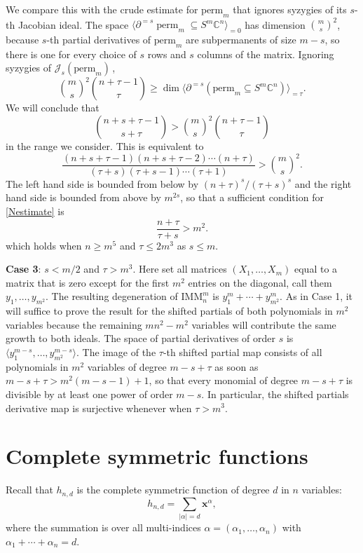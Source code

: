 \documentclass[11pt]{article}
\numberwithin{equation}{section}
\theoremstyle{definition}
\theoremstyle{plain}
\newcommand{\vvirg}{ , \dots , }
\newcommand{\bfx}{\mathbf{x}}
\newcommand{\calJ}{\mathcal{J}}
\newcommand{\perm}{\mathrm{perm}}
\def\BC{\mathbb C}
\def\t{\tau}
\def\tperm{\operatorname{perm}}
\newcommand{\IMM}{\mathrm{IMM}}
\begin{document}
We compare this with the crude estimate for $\perm_m$ that ignores syzygies of its $s$-th Jacobian ideal. The space $\langle \partial^{=s} \tperm_m\subseteq S^m\BC^n \rangle_{=0}$ has dimension $\binom{m}{s}^2$, because $s$-th partial derivatives of $\perm_m$ are subpermanents of size $m-s$, so there is one for every choice of $s$ rows and $s$ columns of the matrix. Ignoring syzygies of $\calJ_s(\perm_m)$\,,
$$
{\binom m s}^2\binom{n+\t-1}{\t} \geq \dim  \langle \partial^{=s}(\perm_m\subseteq S^m\BC^n) \rangle_{=\t}.
$$
We will conclude that
\[
  \binom {n+s+\t-1}{s+\t}>{\binom m s}^2\binom{n+\t-1}{\t}
\]
in the range we consider. This is equivalent to
\begin{equation}\label{Nestimate}
\frac{(n+s+\t-1)( n+s+\t-2)\cdots (n+\t)}{(\t+s)(\t+s-1)\cdots (\t+1)}>{\binom ms}^2.
\end{equation}
The left hand side is bounded from below by ${(n+\tau)^s}/{(\tau + s)^s}$ and the right hand side is bounded from above by $m^{2s}$, so that a sufficient condition for \eqref{Nestimate} is 
 \[
  \frac{n+\tau}{\tau+s} > m^2.
 \]
which holds when $n \geq m^5$  and $\tau \leq 2m^3$ as $s \leq m$. 

 
{\bf Case 3}: $s < {m}/{2}$ and $\t>m^3$. Here set all matrices $(X_1 \vvirg X_m)$ equal to a matrix that is  zero except for  the first $m^2$ entries on the diagonal, call them $y_1 \vvirg y_{m^2}$. The resulting degeneration of $\IMM^m_n$  is $y_1^m+\cdots + y_{m^2}^m$. As in Case 1, it will suffice to prove the result for  the shifted partials of both polynomials in $m^2$ variables because the remaining $mn^2-m^2$ variables will contribute the same growth to both  ideals. The space of partial derivatives of order $s$ is $\langle y_1^{m-s} \vvirg y_{m^2}^{m-s}\rangle$. The image of the $\tau$-th shifted partial map consists of all polynomials in $m^2$ variables of degree $m-s+\t$ as soon as $m-s+\t> m^2(m-s-1)+1$, so that every monomial of degree $m-s+\tau$ is divisible by at least one power of order $m-s$. In particular, the shifted partials derivative map is surjective whenever when $\t>m^3$.  



\section{Complete symmetric functions}

 Recall that  $h_{n,d}$ is the complete symmetric function of degree $d$ in $n$ variables:
\[
 h_{n,d} = \sum_{\vert \alpha \vert = d} \bfx^\alpha,
\]
 where the summation is over all multi-indices $\alpha = (\alpha_1 \vvirg \alpha_n)$ with $\alpha_1 + \cdots + \alpha_n = d$.
\end{document}
